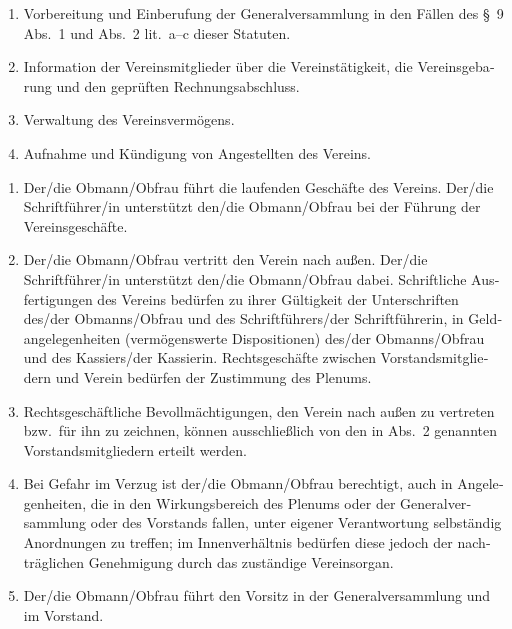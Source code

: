 \begin{otherlanguage}{german}
\begin{enumerate}[statutenenum]
    \item Vorbereitung und Einberufung der Generalversammlung in den Fällen des \S\ 9 Abs.\ 1 und Abs.\ 2 lit.\ a--c dieser Statuten.

    \item Information der Vereinsmitglieder über die Vereinstätigkeit, die Vereinsgebarung und den geprüften Rechnungsabschluss.

    \item Verwaltung des Vereinsvermögens.

    \item Aufnahme und Kündigung von Angestellten des Vereins.
\end{enumerate}


\begin{enumerate}[statutenenum]
    \item Der/die Obmann/Obfrau führt die laufenden Geschäfte des Vereins.
        Der/die Schriftführer/in unterstützt den/die Obmann/Obfrau bei der Führung der Vereinsgeschäfte.

    \item Der/die Obmann/Obfrau vertritt den Verein nach außen.
        Der/die Schriftführer/in unterstützt den/die Obmann/Obfrau dabei.
        Schriftliche Ausfertigungen des Vereins bedürfen zu ihrer Gültigkeit der Unterschriften des/der Obmanns/Obfrau und des Schriftführers/der Schriftführerin, in Geldangelegenheiten (vermögenswerte Dispositionen) des/der Obmanns/Obfrau und des Kassiers/der Kassierin.
        Rechtsgeschäfte zwischen Vorstandsmitgliedern und Verein bedürfen der Zustimmung des Plenums.

    \item Rechtsgeschäftliche Bevollmächtigungen, den Verein nach außen zu vertreten bzw.\ für ihn zu zeichnen, können ausschließlich von den in Abs.\ 2 genannten Vorstandsmitgliedern erteilt werden.

    \item Bei Gefahr im Verzug ist der/die Obmann/Obfrau berechtigt, auch in Angelegenheiten, die in den Wirkungsbereich des Plenums oder der Generalversammlung oder des Vorstands fallen, unter eigener Verantwortung selbständig Anordnungen zu treffen;
        im Innenverhältnis bedürfen diese jedoch der nachträglichen Genehmigung durch das zuständige Vereinsorgan.

    \item Der/die Obmann/Obfrau führt den Vorsitz in der Generalversammlung und im Vorstand.


\end{enumerate}
\end{otherlanguage}
